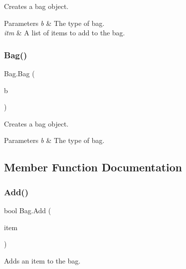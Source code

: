 Creates a bag object. 


\begin{DoxyParams}{Parameters}
{\em b} & The type of bag.\\
\hline
{\em itm} & A list of items to add to the bag.\\
\hline
\end{DoxyParams}
\mbox{\label{class_bag_a8d6e5dcefb12fc099b2b02347e5dacae}} 
\subsubsection{\texorpdfstring{Bag()}{Bag()}\hspace{0.1cm}{\footnotesize\ttfamily [2/2]}}
{\footnotesize\ttfamily Bag.\+Bag (\begin{DoxyParamCaption}\item[{\mbox{\hyperlink{class_bag_a5a827c44705d57202edc93b9a39316c7}{Bag\+Type}}}]{b }\end{DoxyParamCaption})}



Creates a bag object. 


\begin{DoxyParams}{Parameters}
{\em b} & The type of bag.\\
\hline
\end{DoxyParams}


\subsection{Member Function Documentation}
\mbox{\label{class_bag_a4efd17483fce361ea8a01dcda349b3b4}} 
\subsubsection{\texorpdfstring{Add()}{Add()}}
{\footnotesize\ttfamily bool Bag.\+Add (\begin{DoxyParamCaption}\item[{\mbox{\hyperlink{class_base_item}{Base\+Item}}}]{item }\end{DoxyParamCaption})}



Adds an item to the bag. 


